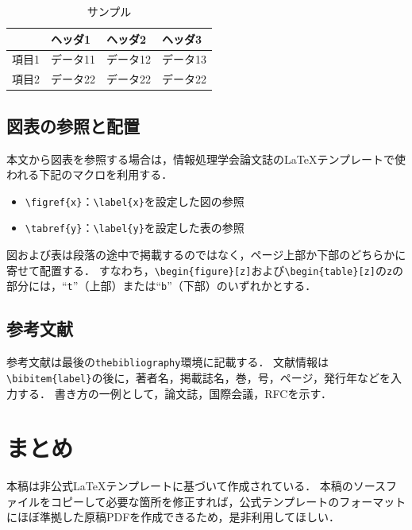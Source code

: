\documentclass[a4j,10pt,twocolumn,uplatex]{jsarticle}
\begin{document}
\begin{table}[tb]
    \centering
    \footnotesize	%
    \caption{サンプル}
    \label{tab:sample}
    \begin{tabular}{l|lll}
        \hline\hline
         & ヘッダ1 & ヘッダ2 & ヘッダ3 \\ 
        \hline 
        項目1 & データ11 & データ12 & データ13 \\
        項目2 & データ22 & データ22 & データ22 \\  
        \hline 
    \end{tabular}
\end{table}

\subsection{図表の参照と配置}
本文から図表を参照する場合は，情報処理学会論文誌の\LaTeX テンプレートで使われる下記のマクロを利用する．
\begin{itemize}
    \item \verb|\figref{x}|：\verb|\label{x}|を設定した図の参照
    \item \verb|\tabref{y}|：\verb|\label{y}|を設定した表の参照
\end{itemize}

図および表は段落の途中で掲載するのではなく，ページ上部か下部のどちらかに寄せて配置する．
すなわち，\verb|\begin{figure}[z]|および\verb|\begin{table}[z]|の\texttt{z}の部分には，``\texttt{t}''（上部）または``\texttt{b}''（下部）のいずれかとする．

\subsection{参考文献}
参考文献は最後の\verb|thebibliography|環境に記載する．
文献情報は\verb|\bibitem{label}|の後に，著者名，掲載誌名，巻，号，ページ，発行年などを入力する．
書き方の一例として，論文誌\cite{Matsuoka22}，国際会議\cite{Suzuki13}，RFC\cite{MIPv4}を示す．


\section{まとめ}

本稿は非公式\LaTeX テンプレートに基づいて作成されている．
本稿のソースファイルをコピーして必要な箇所を修正すれば，公式テンプレートのフォーマットにほぼ準拠した原稿PDFを作成できるため，是非利用してほしい．
\end{document}
